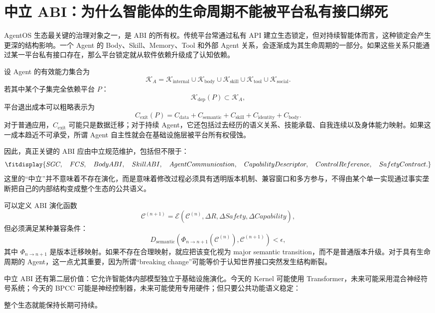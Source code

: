 \section{中立 ABI：为什么智能体的生命周期不能被平台私有接口绑死}

AgentOS 生态最关键的治理对象之一，是 ABI 的所有权。传统平台常通过私有 API 建立生态锁定，但对持续智能体而言，这种锁定会产生更深的结构影响。一个 Agent 的 Body、Skill、Memory、Tool 和外部 Agent 关系，会逐渐成为其生命周期的一部分。如果这些关系只能通过某一平台私有接口存在，那么平台锁定就从软件依赖升级成了认知依赖。

设 Agent 的有效能力集合为
\[
\mathcal K_A
=
\mathcal K_{\mathrm{internal}}
\cup
\mathcal K_{\mathrm{body}}
\cup
\mathcal K_{\mathrm{skill}}
\cup
\mathcal K_{\mathrm{tool}}
\cup
\mathcal K_{\mathrm{social}}.
\]
若其中某个子集完全依赖平台 $P$：
\[
\mathcal K_{\mathrm{dep}}(P)
\subset
\mathcal K_A,
\]
平台退出成本可以粗略表示为
\[
C_{\mathrm{exit}}(P)
=
C_{\mathrm{data}}
+
C_{\mathrm{semantic}}
+
C_{\mathrm{skill}}
+
C_{\mathrm{identity}}
+
C_{\mathrm{body}}.
\]
对于普通应用，$C_{\mathrm{exit}}$ 可能只是数据迁移；对于持续 Agent，它还包括过去经历的语义关系、技能承载、自我连续以及身体能力映射。如果这一成本趋近不可承受，所谓 Agent 自主性就会在基础设施层被平台所有权侵蚀。

因此，真正关键的 ABI 应由中立规范维护，包括但不限于：
\[
\fitdisplay{
SGC,\quad
FCS,\quad
BodyABI,\quad
SkillABI,\quad
AgentCommunication,\quad
CapabilityDescriptor,\quad
ControlReference,\quad
SafetyContract.
}
\]
这里的``中立''并不意味着不存在演化，而是意味着修改过程必须具有透明版本机制、兼容窗口和多方参与，不得由某个单一实现通过事实垄断把自己的内部结构变成整个生态的公共语义。

可以定义 ABI 演化函数
\[
\mathcal C^{(n+1)}
=
\mathcal E(
\mathcal C^{(n)},
\Delta R,
\Delta Safety,
\Delta Capability
),
\]
但必须满足某种兼容条件：
\[
D_{\mathrm{semantic}}
\left(
\Phi_{n\rightarrow n+1}
(\mathcal C^{(n)}),
\mathcal C^{(n+1)}
\right)
<
\epsilon,
\]
其中 $\Phi_{n\rightarrow n+1}$ 是版本迁移映射。如果不存在合理映射，就应把该变化视为 major semantic transition，而不是普通版本升级。对于具有生命周期的 Agent，这一点尤其重要，因为所谓``breaking change''可能等价于认知世界接口突然发生结构断裂。

中立 ABI 还有第二层价值：它允许智能体内部模型独立于基础设施演化。今天的 Kernel 可能使用 Transformer，未来可能采用混合神经符号系统；今天的 BPCC 可能是神经控制器，未来可能使用专用硬件；但只要公共功能语义稳定：
\begin{statementbox}
\centering
{}
\end{statementbox}
整个生态就能保持长期可持续。

